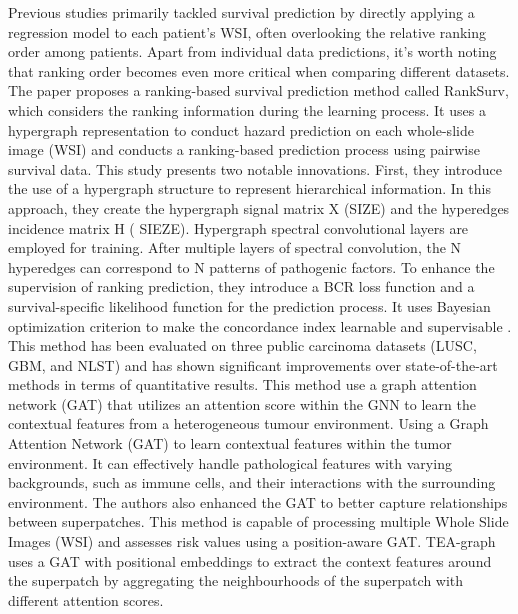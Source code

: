 \documentclass[journal,twoside,web]{ieeecolor}
\begin{document}
Previous studies primarily tackled survival prediction by directly applying a regression model to each patient's WSI, often overlooking the relative ranking order among patients. Apart from individual data predictions, it's worth noting that ranking order becomes even more critical when comparing different datasets. The paper proposes a ranking-based survival prediction method called RankSurv\cite{di2020ranking}, which considers the ranking information during the learning process. It uses a hypergraph representation to conduct hazard prediction on each whole-slide image (WSI) and conducts a ranking-based prediction process using pairwise survival data. This study presents two notable innovations. First, they introduce the use of a hypergraph structure to represent hierarchical information. In this approach, they create the hypergraph signal matrix X (SIZE) and the hyperedges incidence matrix H ( SIEZE). Hypergraph spectral convolutional layers are employed for training. After multiple layers of spectral convolution, the N hyperedges can correspond to N patterns of pathogenic factors. To enhance the supervision of ranking prediction, they introduce a BCR loss function and a survival-specific likelihood function for the prediction process. It uses Bayesian optimization criterion to make the concordance index learnable and supervisable . This method has been evaluated on three public carcinoma datasets (LUSC, GBM, and NLST) and has shown significant improvements over state-of-the-art methods in terms of quantitative results.
This method\cite{lee2022derivation} use a graph attention network (GAT) that utilizes an attention score within the GNN to learn the contextual features from a heterogeneous tumour environment.
Using a Graph Attention Network (GAT) to learn contextual features within the tumor environment. It can effectively handle pathological features with varying backgrounds, such as immune cells, and their interactions with the surrounding environment. The authors also enhanced the GAT to better capture relationships between superpatches. This method is capable of processing multiple Whole Slide Images (WSI) and assesses risk values using a position-aware GAT.
TEA-graph uses a GAT with positional embeddings to extract the context features around the superpatch by aggregating the neighbourhoods of the superpatch with different attention scores.
\end{document}
